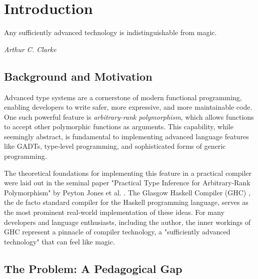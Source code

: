 \chapter{Introduction}
\label{chap:Introduction}

\epigraph{Any sufficiently advanced technology is indistinguishable from magic.}{\textit{Arthur C. Clarke}}

\section{Background and Motivation}

Advanced type systems are a cornerstone of modern functional programming, enabling developers to write safer, more expressive, and more maintainable code. One such powerful feature is \textit{arbitrary-rank polymorphism}, which allows functions to accept other polymorphic functions as arguments. This capability, while seemingly abstract, is fundamental to implementing advanced language features like GADTs, type-level programming, and sophisticated forms of generic programming.

The theoretical foundations for implementing this feature in a practical compiler were laid out in the seminal paper "Practical Type Inference for Arbitrary-Rank Polymorphism" by Peyton Jones et al. \cite{jones-practical-2007}. The Glasgow Haskell Compiler (GHC) \cite{ghc-site-2025}, the de facto standard compiler for the Haskell programming language, serves as the most prominent real-world implementation of these ideas. For many developers and language enthusiasts, including the author, the inner workings of GHC represent a pinnacle of compiler technology, a "sufficiently advanced technology" that can feel like magic.

\section{The Problem: A Pedagogical Gap}

